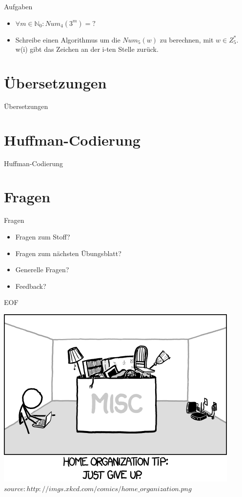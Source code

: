 	
	\begin{frame}{Aufgaben}
		\begin{itemize}
			\item $\forall m \in \mathbb{N}_0 : Num_4({3}^m) = ?$\\
				\visible<2->{
					\color{darkgreen} 
					$4^m - 1$ 
					\color{black}}
					\pause
			\item Schreibe einen Algorithmus um die $Num_5(w)$ zu berechnen, 
			mit $w \in Z_5^*$. \\
			w(i) gibt das Zeichen an der i-ten Stelle zurück.
		\end{itemize}
	\end{frame}
	
	
	
	\section{Übersetzungen}
	\begin{frame}{Übersetzungen}
	
	\end{frame}
	
	
	
	
	\section{Huffman-Codierung}
	\begin{frame}{Huffman-Codierung}
	
	\end{frame}		
	
	
	
	
	\section{Fragen}
	\begin{frame} {Fragen}
		\begin{itemize}
			\item Fragen zum Stoff?
			\item Fragen zum n\"achsten \"Ubungsblatt?
			\item Generelle Fragen?
			\item Feedback?
		\end{itemize}
	\end{frame}

		
	\begin{frame} {EOF}
		\begin{center}
			\includegraphics[scale=0.5]{graphics/eof5.png}\\
			\tiny $source: http://imgs.xkcd.com/comics/home\_organization.png$
		\end{center}
	\end{frame}



